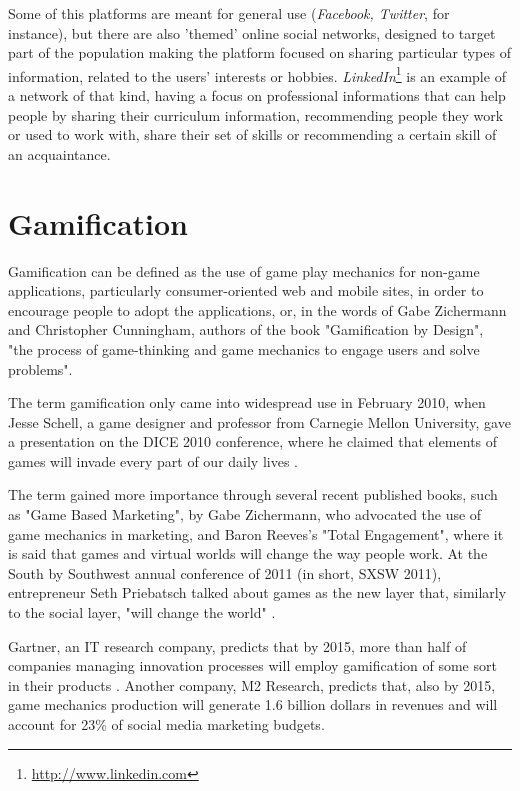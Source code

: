 Some of this platforms are meant for general use (\emph{Facebook, Twitter}, for instance), but there are also 'themed' online social networks, designed to target part of the population making the platform focused on sharing particular types of information, related to the users' interests or hobbies. \emph{LinkedIn}\footnote{\url{http://www.linkedin.com}} is an example of a network of that kind, having a focus on professional informations that can help people by sharing their curriculum information, recommending people they work or used to work with, share their set of skills or recommending a certain skill of an acquaintance.


\section{Gamification} \label{sec:gam} 

Gamification can be defined as the use of game play mechanics for non-game applications, particularly consumer-oriented web and mobile sites, in order to encourage people to adopt the applications, or, in the words of Gabe Zichermann and Christopher Cunningham, authors of the book "Gamification by Design", "the process of game-thinking and game mechanics to engage users and solve problems".

The term gamification only came into widespread use in February 2010, when Jesse Schell, a game designer and professor from Carnegie Mellon University, gave a presentation on the DICE 2010 conference, where he claimed that elements of games will invade every part of our daily lives \cite{kn:Sch10}.

The term gained more importance through several recent published books, such as "Game Based Marketing", by Gabe Zichermann, who advocated the use of game mechanics in marketing, and Baron Reeves's "Total Engagement", where it is said that games  and virtual worlds will change the way people work. At the South by Southwest annual conference of 2011 (in short, SXSW 2011), entrepreneur Seth Priebatsch talked about games as the new layer that, similarly to the social layer, "will change the world" \cite{kn:Xu12}.

Gartner, an IT research company, predicts that by 2015, more than half of companies managing innovation processes will employ gamification of some sort in their products \cite{kn:Xu12}. Another company, M2 Research, predicts that, also by 2015, game mechanics production will generate 1.6 billion dollars in revenues and will account for 23\% of social media marketing budgets. 

